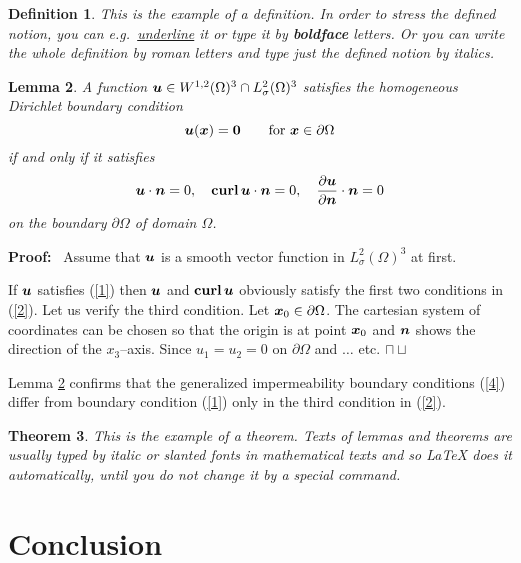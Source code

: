 \documentclass[twocolumn,11pt]{article}
\newtheorem{definition}{Definition}
\newtheorem{lemma}[definition]{Lemma}
\newtheorem{theorem}[definition]{Theorem}
\newcommand{\bfn}{\mbox{\boldmath $n$}}
\newcommand{\bfu}{\mbox{\boldmath $u$}}
\newcommand{\bfx}{\mbox{\boldmath $x$}}
\newcommand{\bfzero}{\mbox{\boldmath $0$}}
\newcommand{\bfcurl}{{\bf curl}} %
\newcommand{\eop}{\hfill $\sqcap\!\!\!\!\sqcup$} %
\begin{document}
\begin{definition} \label{D1}
This is the example of a definition. In order to stress the
defined notion, you can e.g.~\underline{underline} it or type it
by {\bf boldface} letters. \rm Or you can write the whole
definition by roman letters and type just the defined notion by
{\it italics}.
\end{definition}

\begin{lemma} \label{L1}
A function $\bfu\in W^{1,2}(\Omega)^3\cap L^2_{\sigma}(\Omega)^3$
sa\-tisfies the homogeneous Dirichlet boundary condition
\begin{equation}
\bfu(\bfx)=\bfzero \qquad \hbox{for}\ \bfx\in\partial\Omega
\label{1}
\end{equation}
if and only if it satisfies
\begin{eqnarray}
\bfu\cdot\bfn=0, \quad \bfcurl\, \bfu\cdot\bfn=0, \quad
\frac{\partial\bfu}{\partial\bfn}\cdot\bfn=0 \label{2}
\end{eqnarray}
on the boundary $\partial\Omega$ of domain $\Omega$.
\end{lemma}

\noindent
{\bf Proof:} \ Assume that $\bfu$ is a smooth vector function in
$L^2_{\sigma}(\Omega)^3$ at first.

If $\bfu$ satisfies (\ref{1}) then $\bfu$ and $\bfcurl\, \bfu$
obviously satisfy the first two conditions in (\ref{2}). Let us
verify the third condition. Let $\bfx_0\in\partial\Omega$. The
cartesian system of coordinates can be chosen so that the origin
is at point $\bfx_0$ and $\bfn$ shows the direction of the
$x_3$--axis. Since $u_1=u_2=0$ on $\partial\Omega$ and $\dots$
etc. \eop

\vspace{2pt}
Lemma \ref{L1} confirms that the generalized impermeability
boundary conditions (\ref{4}) differ from boundary condition
(\ref{1}) only in the third condition in (\ref{2}).

\begin{theorem} \label{T1}
This is the example of a theorem. Texts of lemmas and theorems are
usually typed by italic or slanted fonts in mathematical texts and
so LaTeX does it automatically, until you do not change it by a
special command.
\end{theorem}

\section{Conclusion}
\label{S3} \vspace{-4pt}
\end{document}
